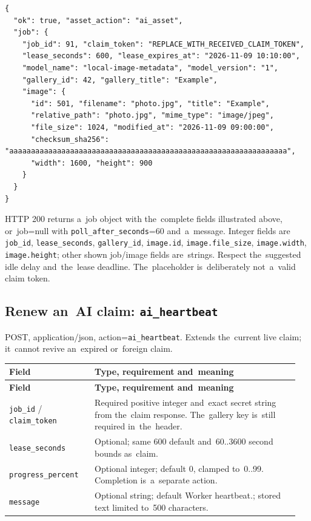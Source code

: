 \documentclass[11pt,a4paper]{article}
\newcommand{\codeword}[1]{\nolinkurl{#1}}
\begin{document}
\begin{lstlisting}[language={}]
{
  "ok": true, "asset_action": "ai_asset",
  "job": {
    "job_id": 91, "claim_token": "REPLACE_WITH_RECEIVED_CLAIM_TOKEN",
    "lease_seconds": 600, "lease_expires_at": "2026-11-09 10:10:00",
    "model_name": "local-image-metadata", "model_version": "1",
    "gallery_id": 42, "gallery_title": "Example",
    "image": {
      "id": 501, "filename": "photo.jpg", "title": "Example",
      "relative_path": "photo.jpg", "mime_type": "image/jpeg",
      "file_size": 1024, "modified_at": "2026-11-09 09:00:00",
      "checksum_sha256": "aaaaaaaaaaaaaaaaaaaaaaaaaaaaaaaaaaaaaaaaaaaaaaaaaaaaaaaaaaaaaaaa",
      "width": 1600, "height": 900
    }
  }
}
\end{lstlisting}

HTTP 200 returns a~job object with the~complete fields illustrated above, or~job=null with
\codeword{poll_after_seconds}=60 and~a~message. Integer fields are \codeword{job_id},
\codeword{lease_seconds}, \codeword{gallery_id}, \codeword{image.id},
\codeword{image.file_size}, \codeword{image.width}, \codeword{image.height}; other shown
job/image fields are~strings. Respect the~suggested idle delay and~the~lease deadline.
The~placeholder is~deliberately not~a~valid claim token.

\subsection{\texorpdfstring{Renew an~AI claim: \codeword{ai_heartbeat}}{Renew an AI claim: ai\_heartbeat}}

\label{api352:ai-heartbeat}

POST, application/json, action=\codeword{ai_heartbeat}. Extends the~current live claim;
it~cannot revive an~expired or~foreign claim.

\begin{longtable}{@{}>{\RaggedRight\arraybackslash}p{0.28\linewidth}>{\RaggedRight\arraybackslash}p{0.67\linewidth}@{}}
\toprule
\textbf{Field} & \textbf{Type, requirement and~meaning} \\
\midrule
\endfirsthead
\toprule
\textbf{Field} & \textbf{Type, requirement and~meaning} \\
\midrule
\endhead
\bottomrule
\endfoot
\codeword{job_id} / \codeword{claim_token} & Required positive integer and~exact secret
string from the~claim response. The~gallery key is~still required in~the~header. \\
\codeword{lease_seconds} & Optional; same 600 default and~60..3600 second bounds as~claim.
\\
\codeword{progress_percent} & Optional integer; default 0, clamped to~0..99. Completion
is~a~separate action. \\
\codeword{message} & Optional string; default Worker heartbeat.; stored text limited to~500
characters. \\
\end{longtable}
\end{document}
